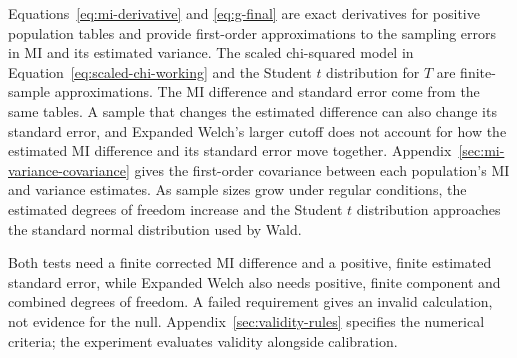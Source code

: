 \begin{samepage}
\medskip
{}

Equations~\eqref{eq:mi-derivative} and \eqref{eq:g-final} are exact
derivatives for positive population tables and provide first-order
approximations to the sampling errors in MI and its estimated variance.
The scaled chi-squared model in Equation~\eqref{eq:scaled-chi-working} and
the Student \(t\) distribution for \(T\) are finite-sample approximations.
The MI difference and standard error come from the same tables. A sample
that changes the estimated difference can also change its standard error,
and Expanded Welch's larger cutoff does not account for how the estimated
MI difference and its standard error move together.
Appendix~\ref{sec:mi-variance-covariance} gives the first-order covariance
between each population's MI and variance estimates.
As sample sizes grow under regular conditions, the estimated
degrees of freedom increase and the Student \(t\) distribution approaches the
standard normal distribution used by Wald.
\par\nopagebreak[4]

Both tests need a finite corrected MI difference and a positive, finite
estimated standard error, while Expanded Welch also needs positive, finite component
and combined degrees of freedom. A failed requirement gives an invalid
calculation, not evidence for the null.
Appendix~\ref{sec:validity-rules} specifies the numerical criteria;
the experiment evaluates validity alongside calibration.
\par
\end{samepage}
